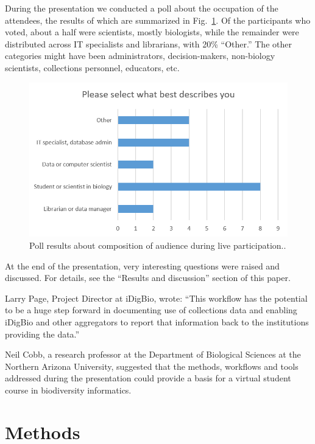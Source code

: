 During the presentation we conducted a poll about the occupation of the attendees, the results of which are summarized in Fig.~\ref{fig:webinar-poll}. Of the participants who voted, about a half were scientists, mostly biologists, while the remainder were distributed across IT specialists and librarians, with 20\% ``Other.'' The other categories might have been administrators, decision-makers, non-biology scientists, collections personnel, educators, etc.

\begin{figure}
\centering
\includegraphics[width=\textwidth]{Figures/webinar-pool}
\decoRule
\caption{Poll results about composition of audience during live participation..}
\label{fig:webinar-poll}
\end{figure}

At the end of the presentation, very interesting questions were raised and discussed. For details, see the ``Results and discussion'' section of this paper.

Larry Page, Project Director at iDigBio, wrote: ``This workflow has the potential to be a huge step forward in documenting use of collections data and enabling iDigBio and other aggregators to report that information back to the institutions providing the data.''

Neil Cobb, a research professor at the Department of Biological Sciences at the Northern Arizona University, suggested that the methods, workflows and tools addressed during the presentation could provide a basis for a virtual student course in biodiversity informatics.

\section{Methods}

